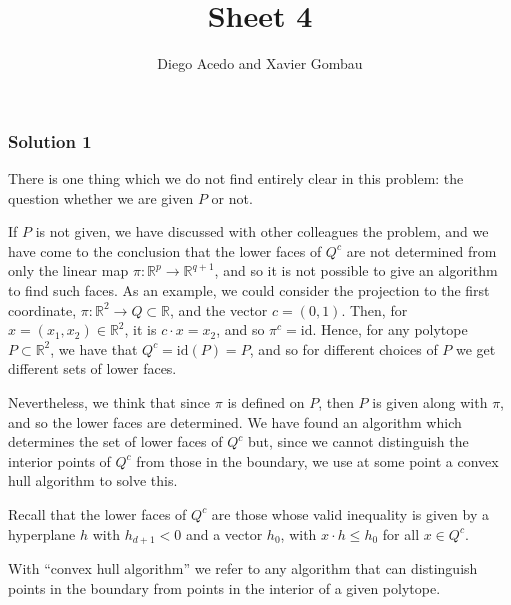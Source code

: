 \documentclass[12pt,a4paper]{article}
\newcommand{\RR}{\mathbb{R}}
\begin{document}

\title{Sheet 4}

\author{Diego Acedo and Xavier Gombau}

\maketitle
\subsubsection*{Solution 1}
There is one thing which we do not find entirely clear in this problem:
the question whether we are given $P$ or not.

If $P$ is not given, we have discussed with other colleagues the problem, and we have come to the conclusion that the lower faces of $Q^c$ are not determined from only the linear map $\pi : \RR^p \longrightarrow \RR^{q+1} $, and so it is not possible to give an algorithm to find such faces. 
As an example, we could consider the projection to the first coordinate, $\pi\colon \RR^2\to Q\subset \RR$, and the vector $c=(0,1)$. Then, for $x=(x_1,x_2)\in \RR^2$, it is $c\cdot x=x_2$, and so $\pi^c=\text{id}$. 
Hence, for any polytope $P\subset \RR^2$, we have that $Q^c=\text{id}(P)=P$, and so for different choices of $P$ we get different sets of lower faces.

Nevertheless, we think that since $\pi$ is defined on $P$, then $P$ is given along with $\pi$, and so the lower faces are determined. 
We have found an algorithm which determines the set of lower faces of $Q^c$ but, since we cannot distinguish the interior points of $Q^c$ from those in the boundary, we use at some point a convex hull algorithm to solve this. 

Recall that the lower faces of $Q^c$ are those whose valid inequality is given by a hyperplane $h$ with $h_{d+1} < 0$ and a vector $h_0$, with $x \cdot h \leq h_0$ for all $x \in Q^c$.

With ``convex hull algorithm'' we refer to any algorithm that can distinguish points in the boundary from points in the interior of a given polytope.
\end{document}
